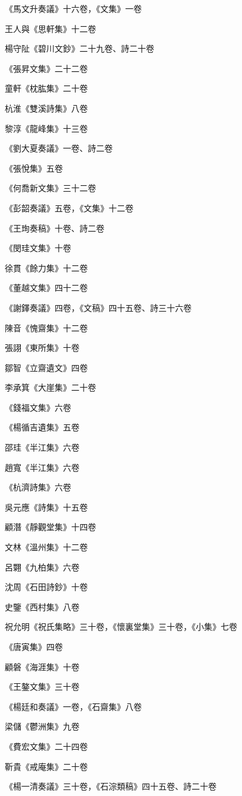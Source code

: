 《馬文升奏議》十六卷，《文集》一卷

王人與《思軒集》十二卷

楊守阯《碧川文鈔》二十九卷、詩二十卷

《張昇文集》二十二卷

童軒《枕肱集》二十卷

杭淮《雙溪詩集》八卷

黎淳《龍峰集》十三卷

《劉大夏奏議》一卷、詩二卷

《張悅集》五卷

《何喬新文集》三十二卷

《彭韶奏議》五卷，《文集》十二卷

《王珣奏稿》十卷、詩二卷

《閔珪文集》十卷

徐貫《餘力集》十二卷

《董越文集》四十二卷

《謝鐸奏議》四卷，《文稿》四十五卷、詩三十六卷

陳音《愧齋集》十二卷

張詡《東所集》十卷

鄒智《立齋遺文》四卷

李承箕《大崖集》二十卷

《錢福文集》六卷

《楊循吉遺集》五卷

邵珪《半江集》六卷

趙寬《半江集》六卷

《杭濟詩集》六卷

吳元應《詩集》十五卷

顧潛《靜觀堂集》十四卷

文林《溫州集》十二卷

呂翾《九柏集》六卷

沈周《石田詩鈔》十卷

史鑒《西村集》八卷

祝允明《祝氏集略》三十卷，《懷裏堂集》三十卷，《小集》七卷

《唐寅集》四卷

顧磐《海涯集》十卷

《王鏊文集》三十卷

《楊廷和奏議》一卷，《石齋集》八卷

梁儲《鬱洲集》九卷

《費宏文集》二十四卷

靳貴《戒庵集》二十卷

《楊一清奏議》三十卷，《石淙類稿》四十五卷、詩二十卷

